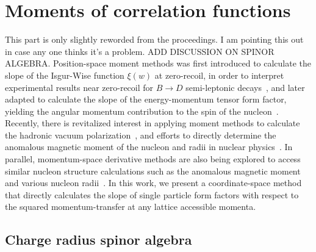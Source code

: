\documentclass[prd,aps,twocolumn,superscriptaddress,tightenlines,nofootinbib,floatfix,preprintnumbers,10pt]{revtex4-1}
\begin{document}
\section{Moments of correlation functions}
{\color{red} This part is only slightly reworded from the
  proceedings. I am pointing this out in case any one thinks it's a
  problem. ADD DISCUSSION ON SPINOR ALGEBRA.}  Position-space moment methods was first introduced to
calculate the slope of the Isgur-Wise function $\xi (w)$ at
zero-recoil, in order to interpret experimental results near
zero-recoil for $B \rightarrow D$ semi-leptonic
decays~\cite{Lellouch:1994zu}, and later adapted to calculate the
slope of the energy-momentum tensor form factor, yielding the angular
momentum contribution to the spin of the
nucleon~\cite{Mathur:1999uf,Gadiyak:2001fe}. Recently, there is
revitalized interest in applying moment methods to calculate the
hadronic vacuum polarization~\cite{Chakraborty:2016mwy,Blum:2016xpd},
and efforts to directly determine the anomalous magnetic moment of the
nucleon and radii in nuclear physics~\cite{Alexandrou:2016rbj}. In
parallel, momentum-space derivative methods are also being explored to
access similar nucleon structure calculations such as the anomalous
magnetic moment and various nucleon
radii~\cite{deDivitiis:2012vs,Tiburzi:2014yra}. In this work, we
present a coordinate-space method that directly calculates the slope
of single particle form factors with respect to the squared
momentum-transfer at any lattice accessible momenta.

\subsection{Charge radius spinor algebra}
\end{document}
